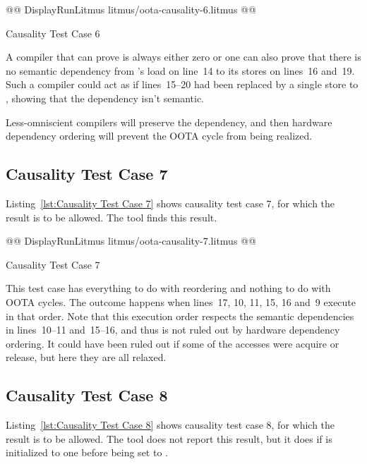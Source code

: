 \documentclass[10]{article}
\begin{document}
\begin{listing}[tbp]
@@ DisplayRunLitmus litmus/oota-causality-6.litmus @@
\caption{Causality Test Case 6}
\label{lst:Causality Test Case 6}
\end{listing}

A compiler that can prove  is always either
zero or one can also prove that there is no semantic dependency
from 's load on line~14 to its stores on lines~16 and~19.
Such a compiler could act as if lines~15--20 had been replaced
by a single store to , showing that the dependency isn't
semantic.

Less-omniscient compilers will preserve the dependency, and then
hardware dependency ordering will prevent the OOTA cycle from
being realized.

\subsection{Causality Test Case 7}
\label{app:Causality Test Case 7}

Listing~\ref{lst:Causality Test Case 7}
shows causality test case 7, for which the 
result is to be allowed.
The  tool finds this result.

\begin{listing}[tbp]
@@ DisplayRunLitmus litmus/oota-causality-7.litmus @@
\caption{Causality Test Case 7}
\label{lst:Causality Test Case 7}
\end{listing}

This test case has everything
to do with reordering and nothing to do with OOTA cycles.
The  outcome happens when lines~17, 10, 11,
15, 16 and~9 execute in that order.
Note that this execution order respects the semantic dependencies in
lines~10--11 and~15--16, and thus is not ruled out by hardware
dependency ordering.
It could have been ruled out if some of the accesses were acquire or
release, but here they are all relaxed.

\subsection{Causality Test Case 8}
\label{app:Causality Test Case 8}

Listing~\ref{lst:Causality Test Case 8}
shows causality test case 8, for which the 
result is to be allowed.
The  tool does not report this result, but it does if
 is initialized to one before being set to
.
\end{document}
